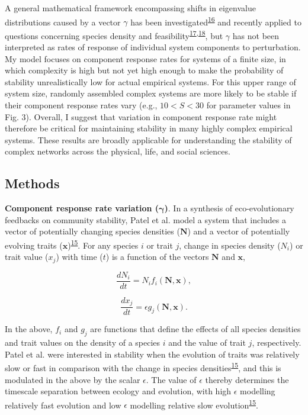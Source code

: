 \documentclass[]{article}
\begin{document}
A general mathematical framework encompassing shifts in eigenvalue
distributions caused by a vector \(\gamma\) has been
investigated\textsuperscript{\protect\hyperlink{ref-Ahmadian2015}{16}}
and recently applied to questions concerning species density and
feasibility\textsuperscript{\protect\hyperlink{ref-Gibbs2017}{17},\protect\hyperlink{ref-Stone2017}{18}},
but \(\gamma\) has not been interpreted as rates of response of
individual system components to perturbation. My model focuses on
component response rates for systems of a finite size, in which
complexity is high but not yet high enough to make the probability of
stability unrealistically low for actual empirical systems. For this
upper range of system size, randomly assembled complex systems are more
likely to be stable if their component response rates vary (e.g.,
\(10 < S < 30\) for parameter values in Fig. 3). Overall, I suggest that
variation in component response rate might therefore be critical for
maintaining stability in many highly complex empirical systems. These
results are broadly applicable for understanding the stability of
complex networks across the physical, life, and social sciences.

\subsection{Methods}\label{methods}

\textbf{Component response rate variation (\(\mathbf{\gamma}\))}. In a
synthesis of eco-evolutionary feedbacks on community stability, Patel et
al. model a system that includes a vector of potentially changing
species densities (\(\mathbf{N}\)) and a vector of potentially evolving
traits
(\(\mathbf{x}\))\textsuperscript{\protect\hyperlink{ref-Patel2018}{15}}.
For any species \(i\) or trait \(j\), change in species density
(\(N_{i}\)) or trait value (\(x_{j}\)) with time (\(t\)) is a function
of the vectors \(\mathbf{N}\) and \(\mathbf{x}\),

\[\frac{dN_{i}}{dt} = N_{i}f_{i}(\mathbf{N}, \mathbf{x}),\]

\[\frac{dx_{j}}{dt} = \epsilon g_{j}(\mathbf{N}, \mathbf{x}).\]

In the above, \(f_{i}\) and \(g_{j}\) are functions that define the
effects of all species densities and trait values on the density of a
species \(i\) and the value of trait \(j\), respectively. Patel et al.
were interested in stability when the evolution of traits was relatively
slow or fast in comparison with the change in species
densities\textsuperscript{\protect\hyperlink{ref-Patel2018}{15}}, and
this is modulated in the above by the scalar \(\epsilon\). The value of
\(\epsilon\) thereby determines the timescale separation between ecology
and evolution, with high \(\epsilon\) modelling relatively fast
evolution and low \(\epsilon\) modelling relative slow
evolution\textsuperscript{\protect\hyperlink{ref-Patel2018}{15}}.
\end{document}
